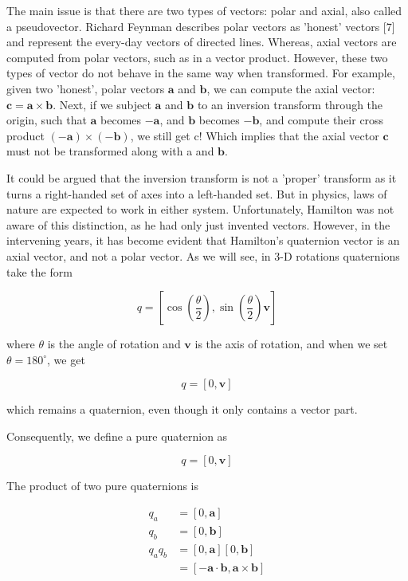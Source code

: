 \documentclass[10pt]{article}
\begin{document}
The main issue is that there are two types of vectors: polar and axial, also called a pseudovector. Richard Feynman describes polar vectors as 'honest' vectors [7] and represent the every-day vectors of directed lines. Whereas, axial vectors are computed from polar vectors, such as in a vector product. However, these two types of vector do not behave in the same way when transformed. For example, given two 'honest', polar vectors $\mathbf{a}$ and $\mathbf{b}$, we can compute the axial vector: $\mathbf{c}=\mathbf{a} \times \mathbf{b}$. Next, if we subject $\mathbf{a}$ and $\mathbf{b}$ to an inversion transform through the origin, such that $\mathbf{a}$ becomes $-\mathbf{a}$, and $\mathbf{b}$ becomes $-\mathbf{b}$, and compute their cross product $(-\mathbf{a}) \times(-\mathbf{b})$, we still get c! Which implies that the axial vector $\mathbf{c}$ must not be transformed along with a and $\mathbf{b}$.

It could be argued that the inversion transform is not a 'proper' transform as it turns a right-handed set of axes into a left-handed set. But in physics, laws of nature are expected to work in either system. Unfortunately, Hamilton was not aware of this distinction, as he had only just invented vectors. However, in the intervening years, it has become evident that Hamilton's quaternion vector is an axial vector, and not a polar vector. As we will see, in 3-D rotations quaternions take the form

$$
q=\left[\cos \left(\frac{\theta}{2}\right), \sin \left(\frac{\theta}{2}\right) \mathbf{v}\right]
$$

where $\theta$ is the angle of rotation and $\mathbf{v}$ is the axis of rotation, and when we set $\theta=180^{\circ}$, we get

$$
q=[0, \mathbf{v}]
$$

which remains a quaternion, even though it only contains a vector part.

Consequently, we define a pure quaternion as

$$
q=[0, \mathbf{v}]
$$

The product of two pure quaternions is

$$
\begin{aligned}
q_{a} & =[0, \mathbf{a}] \\
q_{b} & =[0, \mathbf{b}] \\
q_{a} q_{b} & =[0, \mathbf{a}][0, \mathbf{b}] \\
& =[-\mathbf{a} \cdot \mathbf{b}, \mathbf{a} \times \mathbf{b}]
\end{aligned}
$$
\end{document}
